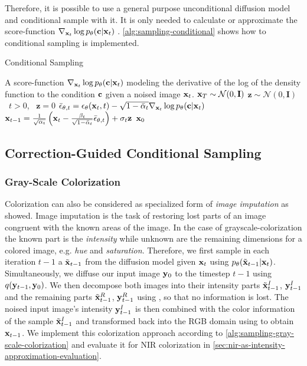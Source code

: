 Therefore, it is possible to use a general purpose unconditional diffusion model and conditional sample with it.
It is only needed to calculate or approximate the score-function $\nabla_{\mathbf{x}_t} \log p_\theta(\mathbf{c}|\mathbf{x}_t)$ \parencite{diffusion-beats-gans}.
\autoref{alg:sampling-conditional} shows how to conditional sampling is implemented.

\begin{algorithm}[htp!]
   \caption{Conditional Sampling}
   \label{alg:sampling-conditional}
   \begin{algorithmic}
      \Require A score-function $\nabla_{\mathbf{x}_t} \log p_\theta(\mathbf{c}|\mathbf{x}_t)$ modeling the derivative of the log of the density function to the condition $\mathbf{c}$ given a noised image $\mathbf{x}_t$.
      \State $\mathbf{x}_T \sim \mathcal{N}(0, \mathbf{I})$
      \State $\mathbf{z} \sim \mathcal{N}(0, \mathbf{I})$ \algorithmicif\ $t > 0$, \algorithmicelse\ $\mathbf{z} = 0$
      \State $\bar{\epsilon}_{\theta, t} = \epsilon_\theta(\mathbf{x}_t, t) - \sqrt{1 - \bar{\alpha}_t} \nabla_{\mathbf{x}_t} \log p_\theta(\mathbf{c}|\mathbf{x}_t)$
      \State $\mathbf{x}_{t-1} = \frac{1}{\sqrt{\alpha_t}} \left(\mathbf{x}_t - \frac{\beta_t}{\sqrt{1 - \bar{\alpha}_t}} \bar{\epsilon}_{\theta, t} \right) + \sigma_t \mathbf{z}$
      \EndFor
      \Return $\mathbf{x}_0$
   \end{algorithmic}
\end{algorithm}

\subsection{Correction-Guided Conditional Sampling}
\label{sec:correction-guided-sampling}

\subsubsection{Gray-Scale Colorization}
\label{sec:correction-guided-sampling-gray-scale-colorization}

Colorization can also be considered as specialized form of \textit{image imputation} as \textcite{sbgm} showed.
Image imputation is the task of restoring lost parts of an image congruent with the known areas of the image.
In the case of grayscale-colorization the known part is the \textit{intensity} while unknown are the remaining dimensions for a colored image, e.g. \textit{hue} and \textit{saturation}.
Therefore, we first sample in each iteration $t-1$ a $\tilde{\mathbf{x}}_{t-1}$ from the diffusion model given $\mathbf{x}_t$ using $p_\theta(\tilde{\mathbf{x}}_{t-1}|\mathbf{x}_t)$.
Simultaneously, we diffuse our input image $\mathbf{y}_0$ to the timestep $t-1$ using $q(\mathbf{y}_{t-1}, \mathbf{y}_0)$.
We then decompose both images into their intensity parts $\tilde{\mathbf{x}}_{t-1}^I$, $\mathbf{y}_{t-1}^I$ and the remaining parts $\tilde{\mathbf{x}}_{t-1}^R$, $\mathbf{y}_{t-1}^R$ using , so that no information is lost.
The noised input image's intensity $\mathbf{y}_{t-1}^I$ is then combined with the color information of the sample $\tilde{\mathbf{x}}_{t-1}^I$ and transformed back into the RGB domain using  to obtain $\mathbf{x}_{t-1}$.
We implement this colorization approach according to \autoref{alg:sampling-gray-scale-colorization} and evaluate it for NIR colorization in \autoref{sec:nir-as-intensity-approximation-evaluation}.

